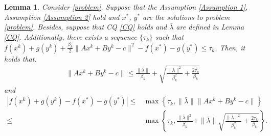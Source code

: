 \documentclass{article}
\numberwithin{equation}{section}
\newtheorem{lemma}{Lemma}[section]
\begin{document}
\begin{lemma} \label{lemma_Ax+By-c}
    Consider \eqref{problem}. Suppose that the Assumption \ref{Assumption 1}, Assumption \ref{Assumption 2} 
    hold and  $x^*$, $y^*$ are the solutions to problem \eqref{problem}. Besides, suppose that 
    CQ \eqref{CQ} holds and $\bar{\lambda}$ are defined in Lemma \ref{CQ}. Additionally,  
    there exists a sequence $\{\tau_k\}$ such that $f(x^k)+ g(y^k)+\frac{\beta_k}{2}\|Ax^k+By^k-c\rVert^2 -f(x^*)-g(y^*)\leq \tau_k$. 
    Then, it holds that.  
    \begin{align}
        \|Ax^k+By^k-c\rVert \leq \frac{\|\bar{\lambda}\rVert}{\beta_k} + \sqrt{\frac{\|\bar{\lambda}\rVert^2}{\beta_k^2}+\frac{2\tau_k}{\beta_k}}
    \end{align}
    and
    \begin{align}
        \left|f(x^k)+ g(y^k) -f(x^*)-g(y^*) \right| \leq & 
        \max\left\{ \tau_k, \|\bar{\lambda}\rVert\|Ax^k+ By^k-c\rVert \right\} \nonumber \\
        \leq & \max\left\{ \tau_k, \frac{\|\bar{\lambda}\rVert^2}{\beta_k} + \|\bar{\lambda}\rVert\sqrt{\frac{\|\bar{\lambda}\rVert^2}{\beta_k^2}+\frac{2\tau_k}{\beta_k}} \right\}. 
    \end{align} 
\end{lemma}
\end{document}
